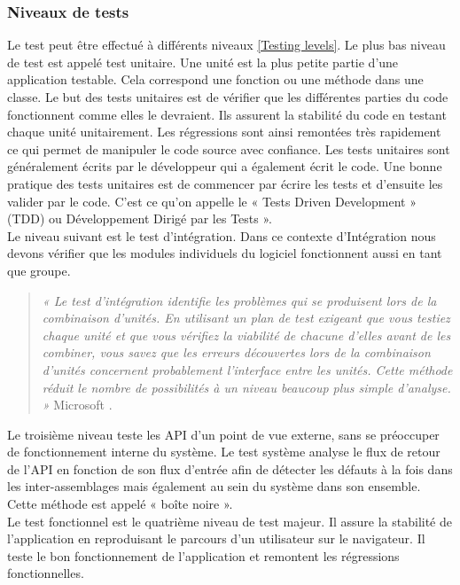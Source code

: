       \subsubsection{Niveaux de tests}
      Le test peut être effectué à différents niveaux \ref{Testing levels}. Le plus bas niveau de test est appelé test unitaire. Une unité est la plus petite partie d’une application testable. Cela correspond une fonction ou une méthode dans une classe. Le but des tests unitaires est de vérifier que les différentes parties du code fonctionnent comme elles le devraient. Ils assurent la stabilité du code en testant chaque unité unitairement. Les régressions sont ainsi remontées très rapidement ce qui permet de manipuler le code source avec confiance. Les tests unitaires sont généralement écrits par le développeur qui a également écrit le code. Une bonne pratique des tests unitaires est de commencer par écrire les tests et d’ensuite les valider par le code. C’est ce qu’on appelle le « Tests Driven Development » (TDD) ou Développement Dirigé par les Tests ».\\

      Le niveau suivant est le test d'intégration. Dans ce contexte d’Intégration nous devons vérifier que les modules individuels du logiciel fonctionnent aussi en tant que groupe.\\

      \begin{quotation}
        \emph{« Le test d'intégration identifie les problèmes qui se produisent lors de la combinaison d'unités. En utilisant un plan de test exigeant que vous testiez chaque unité et que vous vérifiez la viabilité de chacune d'elles avant de les combiner, vous savez que les erreurs découvertes lors de la combinaison d'unités concernent probablement l'interface entre les unités. Cette méthode réduit le nombre de possibilités à un niveau beaucoup plus simple d'analyse. »} Microsoft \cite{Mic16}.\\
      \end{quotation}

      Le troisième niveau teste les API d’un point de vue externe, sans se préoccuper de fonctionnement interne du système. Le test système analyse le flux de retour de l’API en fonction de son flux d’entrée afin de détecter les défauts à la fois dans les inter-assemblages mais également au sein du système dans son ensemble. Cette méthode est appelé « boîte noire ».\\

       Le test fonctionnel est le quatrième niveau de test majeur. Il assure la stabilité de l’application en reproduisant le parcours d’un utilisateur sur le navigateur. Il teste le bon fonctionnement de l’application et remontent les régressions fonctionnelles.\\

